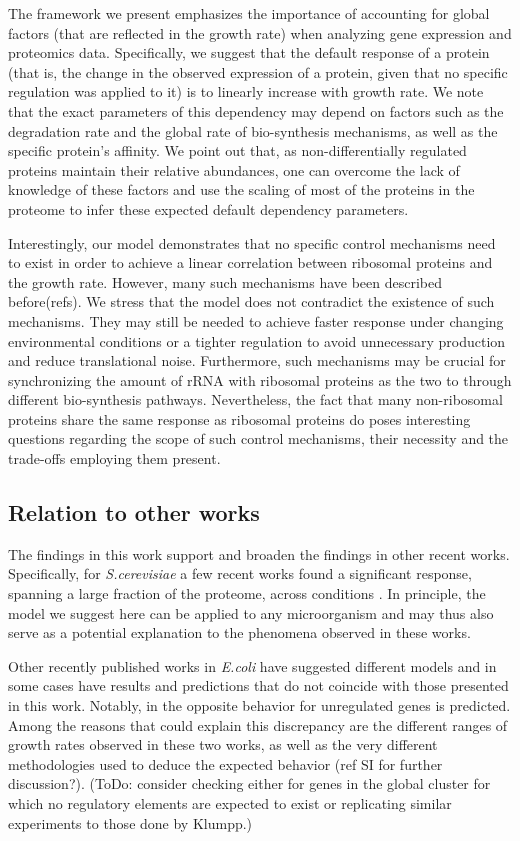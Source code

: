 \documentclass[notitlepage]{article}
\begin{document}
The framework we present emphasizes the importance of accounting for global factors (that are reflected in the growth rate) when analyzing gene expression and proteomics data.
Specifically, we suggest that the default response of a protein (that is, the change in the observed expression of a protein, given that no specific regulation was applied to it) is to linearly increase with growth rate.
We note that the exact parameters of this dependency may depend on factors such as the degradation rate and the global rate of bio-synthesis mechanisms, as well as the specific protein's affinity.
We point out that, as non-differentially regulated proteins maintain their relative abundances, one can overcome the lack of knowledge of these factors and use the scaling of most of the proteins in the proteome to infer these expected default dependency parameters.

Interestingly, our model demonstrates that no specific control mechanisms need to exist in order to achieve a linear correlation between ribosomal proteins and the growth rate.
However, many such mechanisms have been described before(refs).
We stress that the model does not contradict the existence of such mechanisms.
They may still be needed to achieve faster response under changing environmental conditions or a tighter regulation to avoid unnecessary production and reduce translational noise.
Furthermore, such mechanisms may be crucial for synchronizing the amount of rRNA with ribosomal proteins as the two to through different bio-synthesis pathways.
Nevertheless, the fact that many non-ribosomal proteins share the same response as ribosomal proteins do poses interesting questions regarding the scope of such control mechanisms, their necessity and the trade-offs employing them present.

\subsection{Relation to other works}
The findings in this work support and broaden the findings in other recent works.
Specifically, for \emph{S.cerevisiae} a few recent works found a significant response, spanning a large fraction of the proteome, across conditions \parencite{Keren2013a, Gasch2000, Brauer2008a}.
In principle, the model we suggest here can be applied to any microorganism and may thus also serve as a potential explanation to the phenomena observed in these works.

Other recently published works in \emph{E.coli} have suggested different models and in some cases have results  and predictions that do not coincide with those presented in this work.
Notably, in \parencite{Klumpp2009a} the opposite behavior for unregulated genes is predicted.
Among the reasons that could explain this discrepancy are the different ranges of growth rates observed in these two works, as well as the very different methodologies used to deduce the expected behavior (ref SI for further discussion?).
(ToDo: consider checking either for genes in the global cluster for which no regulatory elements are expected to exist or replicating similar experiments to those done by Klumpp.) 
\end{document}

